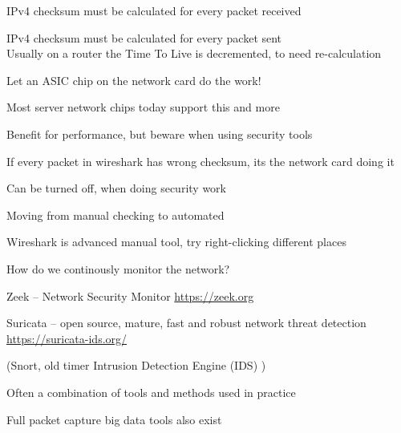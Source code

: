 \documentclass[Screen16to9,17pt]{foils}
\begin{document}

\begin{list1}
\item IPv4 checksum must be calculated for every packet received
\item IPv4 checksum must be calculated for every packet sent\\
Usually on a router the Time To Live is decremented, to need re-calculation
\vskip 1cm
\item Let an ASIC chip on the network card do the work!
\item Most server network chips today support this and more
\item Benefit for performance, but beware when using security tools
\item If every packet in wireshark has wrong checksum, its the network card doing it
\item Can be turned off, when doing security work
\end{list1}
\vskip 1cm





\vskip 3cm
\centerline{\LARGE Moving from manual checking to automated}


\begin{list2}
\item Wireshark is advanced manual tool, try right-clicking different places
\item How do we continously monitor the network?
\end{list2}





\begin{list1}


\item Zeek -- Network Security Monitor {\footnotesize\url{https://zeek.org}}
\item Suricata -- open source, mature, fast and robust network threat detection {\footnotesize\url{https://suricata-ids.org/}}
\item (Snort, old timer Intrusion Detection Engine (IDS) )
\end{list1}


\centerline{Often a combination of tools and methods used in practice}

Full packet capture big data tools also exist
\end{document}
